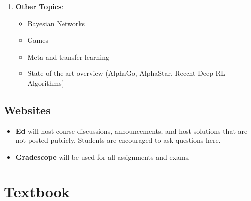 \documentclass[9pt]{article}
\begin{document}
\begin{enumerate}[noitemsep]
\begin{multicols}{2}
\begin{itemize}[noitemsep]
            \item Hidden Markov models
            \item Bayesian filters
            \item Particle filters
            \item Partially observable Markov decision processes (POMDPs)
            \item Exact POMDP methods
            \item Offline POMDP methods
            \item Online POMDP methods
            \item QMDP
        \end{itemize}
        \end{multicols}
    \item \textbf{Other Topics}:
        \begin{multicols}{2}
        \begin{itemize}[noitemsep]
            \item Bayesian Networks
            \item Games
            \item Meta and transfer learning
            \item State of the art overview (AlphaGo, AlphaStar, Recent Deep RL Algorithms)
        \end{itemize}
        \end{multicols}
\end{enumerate}

\begin{samepage}
\section*{Websites}

\begin{itemize}[nosep]
    \item \href{https://edstem.org/}{\textbf{Ed}} will host course discussions, announcements, and host solutions that are not posted publicly. Students are encouraged to ask questions here.
    \item \textbf{Gradescope} will be used for all assignments and exams.
\end{itemize}

\end{samepage}

\section*{Textbook}
\end{document}
